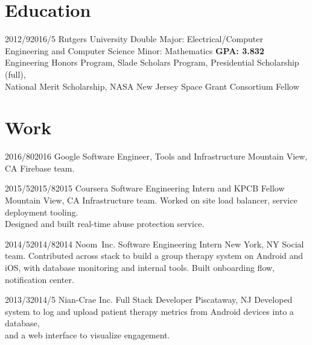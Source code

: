 \documentclass[11pt,letterpaper]{moderncv}
\begin{document}
\maketitle

\section{Education}

\tlcventry
    {2012/9}{2016/5}
    {Rutgers University}
    {Double Major: Electrical/Computer Engineering and Computer Science}
    {Minor: Mathematics}
    {\textbf{GPA: 3.832}}
    {Engineering Honors Program, Slade Scholars Program, Presidential Scholarship (full),\\National Merit Scholarship, NASA New Jersey Space Grant Consortium Fellow}

\section{Work}

	\tllabelcventry
		{2016/8}{0}{2016}
		{Google}
		{Software Engineer, Tools and Infrastructure}
		{Mountain View, CA}
		{}
		{Firebase team.}

    \tllabelcventry
        {2015/5}{2015/8}{2015}
        {Coursera}
        {Software Engineering Intern and KPCB Fellow}
        {Mountain View, CA}
        {}
        {Infrastructure team. Worked on site load balancer, service deployment tooling. \\Designed and built real-time abuse protection service. \\}

    \tllabelcventry
        {2014/5}{2014/8}{2014}
        {Noom~Inc.}
        {Software Engineering Intern}
        {New York, NY}
        {}
        {Social team. Contributed across stack to build a group therapy system on Android and iOS, with database monitoring and internal tools. Built onboarding flow, notification center.\\}

    \tlcventry
        {2013/3}{2014/5}
        {Nian-Crae Inc.}
        {Full Stack Developer}
        {Piscataway, NJ}
        {}
        {Developed system to log and upload patient therapy metrics from Android devices into a database,\\and a web interface to visualize engagement.\\}

\end{document}
